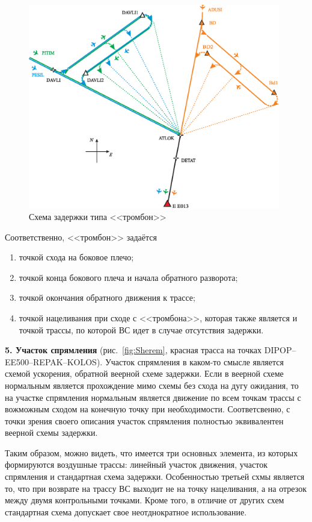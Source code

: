 \documentclass[12pt]{article}
\theoremstyle{plain}
\begin{document}
\begin{figure}[h]
\centering

\includegraphics[width=11cm]{Scheme03_plane.eps}    %

\caption{Схема задержки типа <<тромбон>>} 
\label{fig:TromboneScheme}
\end{figure}

Соответственно, <<тромбон>> задаётся 
\begin{enumerate}[topsep=-0.5\parsep,itemsep=-0.5\parsep]
  \item точкой схода на боковое плечо; 
  \item точкой конца бокового плеча и начала обратного разворота;
  \item точкой окончания обратного движения к трассе;
  \item точкой нацеливания при сходе с <<тромбона>>, которая также является и точкой трассы, по которой ВС идет в случае отсутствия задержки.
\end{enumerate}

\medskip

\textbf{5. Участок спрямления} (рис.~\ref{fig:Sherem}, красная трасса на точках DIPOP--EE500--REPAK--KOLOS). Участок спрямления в каком-то смысле является схемой ускорения, обратной веерной схеме задержки. Если в веерной схеме нормальным является прохождение мимо схемы без схода на дугу ожидания, то на участке спрямления нормальным является движение по всем точкам трассы с вожможным сходом на конечную точку при необходимости. Соответсвенно, с точки зрения своего описания участок спрямления полностью эквивалентен веерной схемы задержки.

\medskip

Таким образом, можно видеть, что имеется три основных элемента, из которых формируются воздушные трассы: линейный участок движения, участок спрямления и стандартная схема задержки. Особенностью третьей схмы является то, что при возврате на трассу ВС выходит не на точку нацеливания, а на отрезок между двумя контрольными точками. Кроме того, в отличие от других схем стандартная схема допускает свое неотднократное использование.
\end{document}
